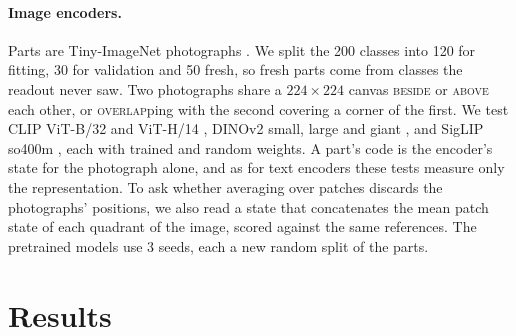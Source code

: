 \documentclass[10pt]{article}
\theoremstyle{plain}
\theoremstyle{remark}
\begin{document}
\paragraph{Image encoders.} Parts are Tiny-ImageNet photographs \citep{le2015tiny}. We split the 200 classes into 120 for fitting, 30 for validation and 50 fresh, so fresh parts come from classes the readout never saw. Two photographs share a $224 \times 224$ canvas \textsc{beside} or \textsc{above} each other, or \textsc{overlap}ping with the second covering a corner of the first. We test CLIP ViT-B/32 and ViT-H/14 \citep{radford2021clip,cherti2023}, DINOv2 small, large and giant \citep{oquab2024dinov2}, and SigLIP so400m \citep{zhai2023siglip}, each with trained and random weights. A part's code is the encoder's state for the photograph alone, and as for text encoders these tests measure only the representation. To ask whether averaging over patches discards the photographs' positions, we also read a state that concatenates the mean patch state of each quadrant of the image, scored against the same references. The pretrained models use 3 seeds, each a new random split of the parts.

\section{Results}
\label{sec:results}
\end{document}
